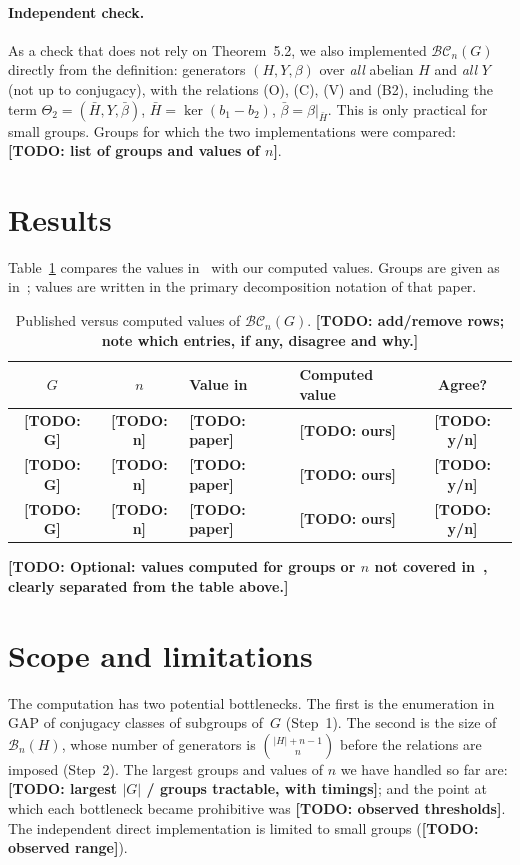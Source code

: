 \documentclass[11pt]{article}
\newcommand{\todo}[1]{\textbf{[TODO: #1]}}
\newcommand{\BC}{\mathcal{BC}}   %
\newcommand{\B}{\mathcal{B}}     %
\begin{document}
\paragraph{Independent check.}
As a check that does not rely on Theorem~5.2, we also implemented $\BC_n(G)$ directly from
the definition: generators $(H,Y,\beta)$ over \emph{all} abelian $H$ and \emph{all} $Y$ (not up
to conjugacy), with the relations (O), (C), (V) and (B2), including the term
$\Theta_2=(\bar H,Y,\bar\beta)$, $\bar H=\ker(b_1-b_2)$, $\bar\beta=\beta|_{\bar H}$. This is
only practical for small groups. Groups for which the two implementations were compared:
\todo{list of groups and values of $n$}.

\section{Results}

Table~\ref{tab:results} compares the values in~\cite{TYZ} with our computed values.
Groups are given as in~\cite{TYZ}; values are written in the primary decomposition
notation of that paper.

\begin{table}[ht]
\centering
\begin{tabular}{|c|c|l|l|c|}
\hline
$G$ & $n$ & Value in \cite{TYZ} & Computed value & Agree? \\
\hline
\todo{G} & \todo{n} & \todo{paper} & \todo{ours} & \todo{y/n} \\
\todo{G} & \todo{n} & \todo{paper} & \todo{ours} & \todo{y/n} \\
\todo{G} & \todo{n} & \todo{paper} & \todo{ours} & \todo{y/n} \\
\hline
\end{tabular}
\caption{Published versus computed values of $\BC_n(G)$.
\todo{add/remove rows; note which entries, if any, disagree and why.}}
\label{tab:results}
\end{table}

\todo{Optional: values computed for groups or $n$ not covered in~\cite{TYZ}, clearly
separated from the table above.}

\section{Scope and limitations}

The computation has two potential bottlenecks. The first is the enumeration in GAP of
conjugacy classes of subgroups of~$G$ (Step~1). The second is the size of $\B_n(H)$,
whose number of generators is $\binom{|H|+n-1}{n}$ before the relations are imposed
(Step~2). The largest groups and values of $n$ we have handled so far are:
\todo{largest $|G|$ / groups tractable, with timings}; and the point at which
each bottleneck became prohibitive was \todo{observed thresholds}.
The independent direct implementation is limited to small groups (\todo{observed range}).
\end{document}
